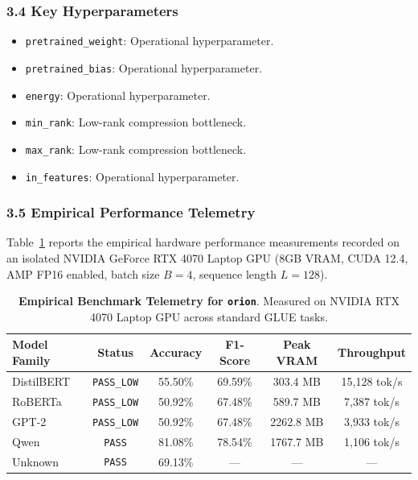 \subsubsection*{3.4 Key Hyperparameters}
\begin{itemize}
    \item \texttt{pretrained\_weight}: Operational hyperparameter.
    \item \texttt{pretrained\_bias}: Operational hyperparameter.
    \item \texttt{energy}: Operational hyperparameter.
    \item \texttt{min\_rank}: Low-rank compression bottleneck.
    \item \texttt{max\_rank}: Low-rank compression bottleneck.
    \item \texttt{in\_features}: Operational hyperparameter.
\end{itemize}

\subsubsection*{3.5 Empirical Performance Telemetry}
Table~\ref{tab:telemetry_orion} reports the empirical hardware performance measurements recorded on an isolated NVIDIA GeForce RTX 4070 Laptop GPU (8GB VRAM, CUDA 12.4, AMP FP16 enabled, batch size $B=4$, sequence length $L=128$).

\begin{table}[h]
\centering
\small
\caption{\textbf{Empirical Benchmark Telemetry for \texttt{orion}}. Measured on NVIDIA RTX 4070 Laptop GPU across standard GLUE tasks.}
\label{tab:telemetry_orion}
\begin{tabular*}{\columnwidth}{@{\extracolsep{\fill}}lccccc}
\toprule
\textbf{Model Family} & \textbf{Status} & \textbf{Accuracy} & \textbf{F1-Score} & \textbf{Peak VRAM} & \textbf{Throughput} \\
\midrule
DistilBERT & \texttt{PASS\_LOW} & 55.50\% & 69.59\% & 303.4 MB & 15,128 tok/s \\
RoBERTa & \texttt{PASS\_LOW} & 50.92\% & 67.48\% & 589.7 MB & 7,387 tok/s \\
GPT-2 & \texttt{PASS\_LOW} & 50.92\% & 67.48\% & 2262.8 MB & 3,933 tok/s \\
Qwen & \texttt{PASS} & 81.08\% & 78.54\% & 1767.7 MB & 1,106 tok/s \\
Unknown & \texttt{PASS} & 69.13\% & --- & --- & --- \\
\bottomrule
\end{tabular*}
\end{table}

